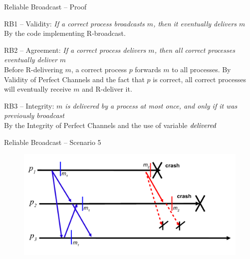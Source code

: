 \begin{frame}{Reliable Broadcast -- Proof}


\BIL
\item \alert{RB1 -- Validity}: \emph{If a correct process broadcasts $m$, then it eventually delivers $m$}\\
By the code implementing R-broadcast.
\item \alert{RB2 -- Agreement}: \emph{If a correct process delivers $m$, then all correct processes eventually deliver $m$}\\
Before R-delivering $m$, a correct process $p$ forwards $m$ to all processes. 
By Validity of Perfect Channels and the fact that $p$ is correct, all correct processes will eventually receive $m$ and R-deliver it.
\item \alert{RB3 -- Integrity}: \emph{$m$ is delivered by a process at most once, and only if it was previously broadcast}\\
By the Integrity of Perfect Channels and the use of variable $\textit{delivered}$
\EIL

\end{frame}

\begin{frame}{Reliable Broadcast -- Scenario 5}


\begin{figure}
\includegraphics[width=\textwidth]{rb-scenario5}
\end{figure}


\end{frame}

